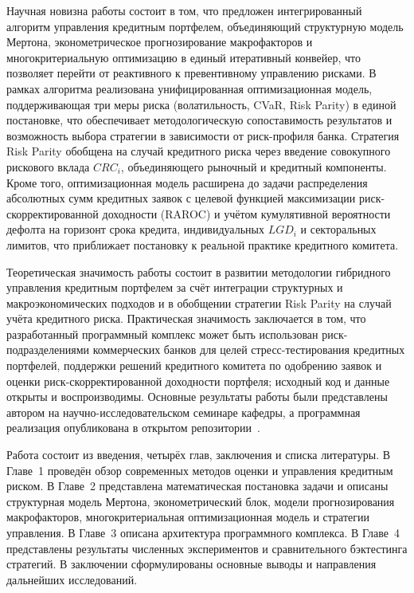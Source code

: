 \documentclass[]{article}
\begin{document}
	Научная новизна работы состоит в том, что предложен интегрированный алгоритм управления
	кредитным портфелем, объединяющий структурную модель Мертона, эконометрическое прогнозирование
	макрофакторов и многокритериальную оптимизацию в единый итеративный конвейер, что позволяет
	перейти от реактивного к превентивному управлению рисками. В рамках алгоритма реализована
	унифицированная оптимизационная модель, поддерживающая три меры риска (волатильность, CVaR,
	Risk Parity) в единой постановке, что обеспечивает методологическую сопоставимость результатов
	и возможность выбора стратегии в зависимости от риск-профиля банка. Стратегия Risk Parity
	обобщена на случай кредитного риска через введение совокупного рискового вклада $CRC_i$,
	объединяющего рыночный и кредитный компоненты. Кроме того, оптимизационная модель расширена
	до задачи распределения абсолютных сумм кредитных заявок с целевой функцией максимизации
	риск-скорректированной доходности (RAROC) и учётом кумулятивной вероятности дефолта на
	горизонт срока кредита, индивидуальных $LGD_i$ и секторальных лимитов, что приближает
	постановку к реальной практике кредитного комитета.

	Теоретическая значимость работы состоит в развитии методологии гибридного управления кредитным
	портфелем за счёт интеграции структурных и макроэкономических подходов и в обобщении стратегии
	Risk Parity на случай учёта кредитного риска. Практическая значимость заключается в том, что
	разработанный программный комплекс может быть использован риск-подразделениями коммерческих
	банков для целей стресс-тестирования кредитных портфелей, поддержки решений кредитного комитета
	по одобрению заявок и оценки риск-скорректированной доходности портфеля; исходный код и данные
	открыты и воспроизводимы. Основные результаты работы были представлены автором на
	научно-исследовательском семинаре кафедры, а программная реализация опубликована в открытом
	репозитории~\cite{Github}.

	Работа состоит из введения, четырёх глав, заключения и списка литературы. В Главе~1 проведён
	обзор современных методов оценки и управления кредитным риском. В Главе~2 представлена
	математическая постановка задачи и описаны структурная модель Мертона, эконометрический блок,
	модели прогнозирования макрофакторов, многокритериальная оптимизационная модель и стратегии
	управления. В Главе~3 описана архитектура программного комплекса. В Главе~4 представлены
	результаты численных экспериментов и сравнительного бэктестинга стратегий. В заключении
	сформулированы основные выводы и направления дальнейших исследований.
\end{document}
